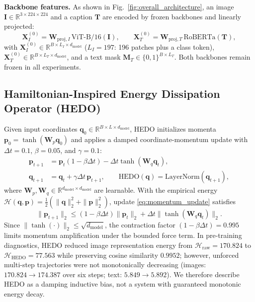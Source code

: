 \documentclass[runningheads,a4paper]{llncs}
\begin{document}
\textbf{Backbone features.} As shown in Fig.~\ref{fig:overall_architecture}, an image $\mathbf{I} \in \mathbb{R}^{3 \times 224 \times 224}$ and a caption $\mathbf{T}$ are encoded by frozen backbones and linearly projected:
\begin{equation}
\mathbf{X}_I^{(0)} = \mathbf{W}_{\text{proj}, I} \, \text{ViT-B/16}(\mathbf{I}), \qquad \mathbf{X}_T^{(0)} = \mathbf{W}_{\text{proj}, T} \, \text{RoBERTa}(\mathbf{T}), \label{eq:backbone}
\end{equation}
with $\mathbf{X}_I^{(0)} \in \mathbb{R}^{B \times L_I \times d_{\text{model}}}$ ($L_I = 197$: 196 patches plus a class token), $\mathbf{X}_T^{(0)} \in \mathbb{R}^{B \times L_T \times d_{\text{model}}}$, and a text mask $\mathbf{M}_T \in \{0, 1\}^{B \times L_T}$. Both backbones remain frozen in all experiments.

\subsection{Hamiltonian-Inspired Energy Dissipation Operator (HEDO)}
Given input coordinates $\mathbf{q}_0 \in \mathbb{R}^{B \times L \times d_{\text{model}}}$, HEDO initializes momenta $\mathbf{p}_0 = \tanh(\mathbf{W}_p \mathbf{q}_0)$ and applies a damped coordinate-momentum update with $\Delta t = 0.1$, $\beta = 0.05$, and $\gamma = 0.1$:
\begin{align}
\mathbf{p}_{t+1} &= \mathbf{p}_t (1 - \beta \Delta t) - \Delta t \tanh(\mathbf{W}_q \mathbf{q}_t), \label{eq:momentum_update} \\
\mathbf{q}_{t+1} &= \mathbf{q}_t + \gamma \Delta t \, \mathbf{p}_{t+1}, \qquad \text{HEDO}(\mathbf{q}) = \text{LayerNorm}(\mathbf{q}_{t+1}), \label{eq:hedo}
\end{align}
where $\mathbf{W}_p, \mathbf{W}_q \in \mathbb{R}^{d_{\text{model}} \times d_{\text{model}}}$ are learnable. With the empirical energy $\mathcal{H}(\mathbf{q}, \mathbf{p}) = \frac{1}{2}(\|\mathbf{q}\|_2^2 + \|\mathbf{p}\|_2^2)$, update \eqref{eq:momentum_update} satisfies
\begin{equation}
\|\mathbf{p}_{t+1}\|_2 \le (1 - \beta \Delta t)\|\mathbf{p}_t\|_2 + \Delta t \|\tanh(\mathbf{W}_q \mathbf{q}_t)\|_2 .
\end{equation}
Since $\|\tanh(\cdot)\|_2 \le \sqrt{d_{\text{model}}}$, the contraction factor $(1 - \beta \Delta t) = 0.995$ limits momentum amplification under the bounded force term. In pre-training diagnostics, HEDO reduced image representation energy from $\mathcal{H}_{\text{raw}} = 170.824$ to $\mathcal{H}_{\text{HEDO}} = 77.563$ while preserving cosine similarity $0.9952$; however, unforced multi-step trajectories were not monotonically decreasing (images: $170.824 \to 174.387$ over six steps; text: $5.849 \to 5.892$). We therefore describe HEDO as a damping inductive bias, not a system with guaranteed monotonic energy decay.
\end{document}
